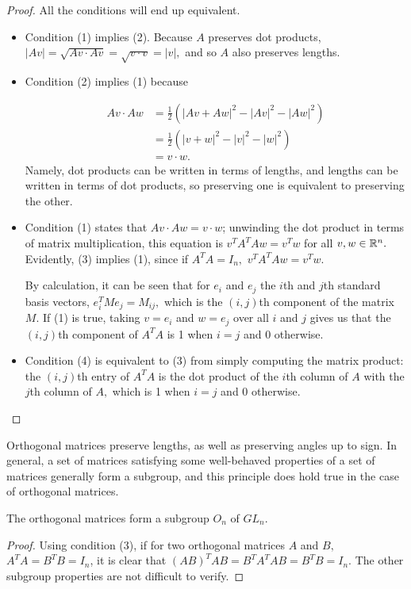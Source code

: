 \begin{proof}
All the conditions will end up equivalent.
\begin{itemize}
    \item Condition (1) implies (2). Because $A$ preserves dot products, $|Av| = \sqrt{Av\cdot Av} = \sqrt{v\cdot v} = |v|,$ and so $A$ also preserves lengths.
    
    \item Condition (2) implies (1) because
    
    \begin{align*}
            Av \cdot Aw &= \frac{1}{2} \left(|Av + Aw|^2 - |Av|^2 - |Aw|^2\right)\\
            &= \frac{1}{2} \left(|v + w|^2 - |v|^2 - |w|^2\right) \\
            &= v \cdot w.
    \end{align*} 
    Namely, dot products can be written in terms of lengths, and lengths can be written in terms of dot products, so preserving one is equivalent to preserving the other.

    \item Condition (1) states that $Av \cdot Aw = v \cdot w$; unwinding the dot product in terms of matrix multiplication, this equation is $v^TA^TAw = v^Tw$ for all $v, w \in \mathbb R^n.$ Evidently, (3) implies (1), since if $A^TA = I_n,$ $v^TA^TAw = v^Tw.$ 
    
    By calculation, it can be seen that for $e_i$ and $e_j$ the $i$th and $j$th standard basis vectors, $e_i^T M e_j = M_{ij},$ which is the $(i, j)$th component of the matrix $M.$ If (1) is true, taking $v = e_i$ and $w = e_j$ over all $i$ and $j$ gives us that the $(i, j)$th component of $A^TA$ is 1 when $i = j$ and 0 otherwise.


    \item Condition (4) is equivalent to (3) from simply computing the matrix product: the $(i, j)$th entry of $A^TA$ is the dot product of the $i$th column of $A$ with the $j$th column of $A,$ which is 1 when $i = j$ and 0 otherwise.

\end{itemize}
\end{proof}

Orthogonal matrices preserve lengths, as well as preserving angles up to sign. In general, a set of matrices satisfying some well-behaved properties of a set of matrices generally form a subgroup, and this principle does hold true in the case of orthogonal matrices.
\begin{proposition}
    The orthogonal matrices form a subgroup $O_n$ of $GL_n$. 
\end{proposition}
\begin{proof}
    Using condition (3), if for two orthogonal matrices $A$ and $B,$ $A^TA = B^TB = I_n$, it is clear that $(AB)^TAB = B^TA^TAB = B^TB = I_n$. The other subgroup properties are not difficult to verify. 
\end{proof}

